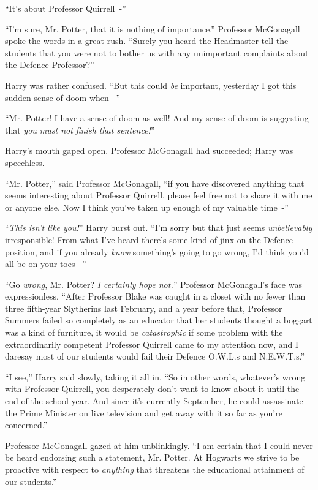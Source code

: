 ``It's about Professor Quirrell~-''

``I'm sure, Mr. Potter, that it is nothing of importance.'' Professor McGonagall spoke the words in a great rush. ``Surely you heard the Headmaster tell the students that you were not to bother us with any unimportant complaints about the Defence Professor?''

Harry was rather confused. ``But this could \emph{be} important, yesterday I got this sudden sense of doom when~-''

``Mr. Potter! I have a sense of doom as well! And my sense of doom is suggesting that \emph{you must not finish that sentence!}''

Harry's mouth gaped open. Professor McGonagall had succeeded; Harry was speechless.

``Mr. Potter,'' said Professor McGonagall, ``if you have discovered anything that seems interesting about Professor Quirrell, please feel free not to share it with me or anyone else. Now I think you've taken up enough of my valuable time~-''

``\emph{This isn't like you!}'' Harry burst out. ``I'm sorry but that just seems \emph{unbelievably} irresponsible! From what I've heard there's some kind of jinx on the Defence position, and if you already \emph{know} something's going to go wrong, I'd think you'd all be on your toes~-''

``Go \emph{wrong}, Mr. Potter? \emph{I certainly hope not.}'' Professor McGonagall's face was expressionless. ``After Professor Blake was caught in a closet with no fewer than three fifth-year Slytherins last February, and a year before that, Professor Summers failed so completely as an educator that her students thought a boggart was a kind of furniture, it would be \emph{catastrophic} if some problem with the extraordinarily competent Professor Quirrell came to my attention now, and I daresay most of our students would fail their Defence O.W.L.s and N.E.W.T.s.''

``I see,'' Harry said slowly, taking it all in. ``So in other words, whatever's wrong with Professor Quirrell, you desperately don't want to know about it until the end of the school year. And since it's currently September, he could assassinate the Prime Minister on live television and get away with it so far as you're concerned.''

Professor McGonagall gazed at him unblinkingly. ``I am certain that I could never be heard endorsing such a statement, Mr. Potter. At Hogwarts we strive to be proactive with respect to \emph{anything} that threatens the educational attainment of our students.''

